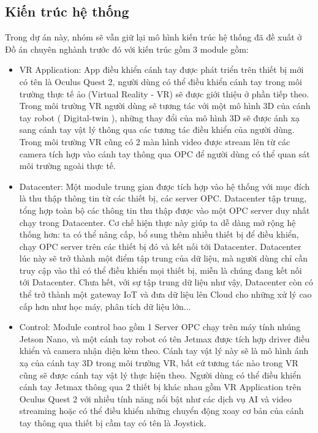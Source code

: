 \subsection{Kiến trúc hệ thống}
Trong dự án này, nhóm sẽ vẫn giữ lại mô hình kiến trúc hệ thống đã đề xuất ở Đồ án chuyên nghành trước đó với kiến trúc gồm 3 module gồm: 
\begin{itemize}
    \item VR Application: App điều khiển cánh tay được phát triển trên thiết bị mới có tên là Oculus Quest 2, người dùng có thể điều khiển cánh tay trong môi trường thực tế ảo (Virtual Reality - VR) sẽ được giới thiệu ở phần tiếp theo. Trong môi trường VR người dùng sẽ tương tác với một mô hình 3D của cánh tay robot ( Digital-twin ), những thay đổi của mô hình 3D sẽ được ánh xạ sang cánh tay vật lý thông qua các tương tác điều khiển của người dùng. Trong môi trường VR cũng có 2 màn hình video được stream lên từ các camera tích hợp vào cánh tay thông qua OPC để người dùng có thể quan sát môi trường ngoài thực tế.
    \item Datacenter: Một module trung gian được tích hợp vào hệ thống với mục đích là thu thập thông tin từ các thiết bị, các server OPC. Datacenter tập trung, tổng hợp toàn bộ các thông tin thu thập được vào một OPC server duy nhất chạy trong Datacenter. Cơ chế hiện thực này giúp ta dễ dàng mở rộng hệ thống hơn: ta có thể nâng cấp, bổ sung thêm nhiều thiết bị để điều khiển, chạy OPC server trên các thiết bị đó và kết nối tới Datacenter. Datacenter lúc này sẽ trở thành một điểm tập trung của dữ liệu, mà người dùng chỉ cần truy cập vào thì có thể điều khiển mọi thiết bị, miễn là chúng đang kết nối tới Datacenter. Chưa hết, với sự tập trung dữ liệu như vậy, Datacenter còn có thể trở thành một gateway IoT và đưa dữ liệu lên Cloud cho những xử lý cao cấp hơn như học máy, phân tích dữ liệu lớn...
    \item Control: Module control bao gồm 1 Server OPC chạy trên máy tính nhúng Jetson Nano, và một cánh tay robot có tên Jetmax được tích hợp driver điều khiển và camera nhận diện kèm theo. Cánh tay vật lý này sẽ là mô hình ánh xạ của cánh tay 3D trong môi trường VR, bất cứ tương tác nào trong VR cũng sẽ được cánh tay vật lý thực hiện theo. Người dùng có thể điều khiển cánh tay Jetmax thông qua 2 thiết bị khác nhau gồm VR Application trên Oculus Quest 2 với nhiều tính năng nổi bật như các dịch vụ AI và video streaming hoặc có thể điều khiển những chuyển động xoay cơ bản của cánh tay thông qua thiết bị cầm tay có tên là Joystick.
\end{itemize}

